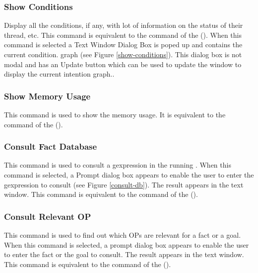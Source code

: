 \subsubsection{Show Conditions}


Display all the conditions, if any, with lot of information on the status of
their thread, etc. This command is equivalent to the 
command of the \CPK{} ().  When this
command is selected a Text Window Dialog Box is poped up and contains the
current condition. graph (see Figure \ref{show-conditions}). This dialog box is
not modal and has an Update button which can be used to update the window to
display the current intention graph..

\subsubsection{Show Memory Usage}

This command is used to show the memory usage. It is equivalent to the
 command of the \CPK{} ().

\subsubsection{Consult Fact Database}


This command is used to consult a gexpression in the running \XPK{}.  When this
command is selected, a Prompt dialog box appears to enable the user to enter
the gexpression to consult (see Figure \ref{consult-db}). The result appears in
the text window. This command is equivalent to the  command of the \CPK{} ().

\subsubsection{Consult Relevant OP}

This command is used to find out which OPs are relevant for a fact or a goal.
When this command is selected, a prompt dialog box appears to enable the user
to enter the fact or the goal to consult. The result appears in the text
window. This command is equivalent to the 
command of the \CPK{} (). 

